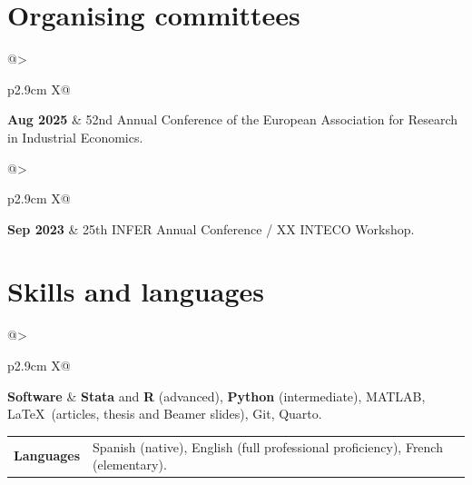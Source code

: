 \documentclass[a4paper,11pt]{article}
\makeatletter
\newcommand{\entry}[2]{%
  \begin{tabularx}{\linewidth}{@{}>{\raggedright\arraybackslash}p{2.9cm} X@{}}
    \textbf{#1} & #2
  \end{tabularx}\par}
\makeatother
\begin{document}
\section{Organising committees}

\entry{Aug 2025}{52nd Annual Conference of the European Association for Research in Industrial Economics.}

\entry{Sep 2023}{25th INFER Annual Conference / XX INTECO Workshop.}

\section{Skills and languages}

\entry{Software}{\textbf{Stata} and \textbf{R} (advanced), \textbf{Python} (intermediate), MATLAB, \LaTeX\ (articles,
thesis and Beamer slides), Git, Quarto.}
\entry{Languages}{Spanish (native), English (full professional proficiency), French (elementary).}
\end{document}
